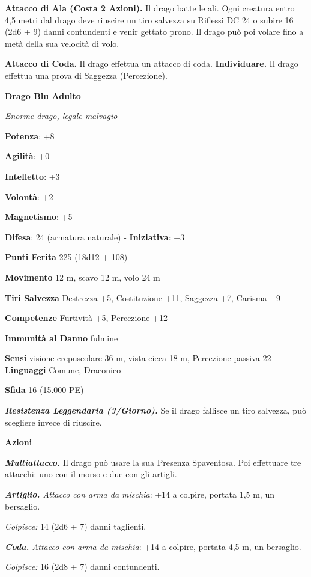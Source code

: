 \begin{multicols}{2}
\textbf{Attacco di Ala (Costa 2 Azioni).} Il drago batte le ali. Ogni
creatura entro 4,5 metri dal drago deve riuscire un tiro salvezza su Riflessi DC 24 o subire 16 (2d6 + 9) danni contundenti e venir gettato
prono. Il drago può poi volare fino a metà della sua velocità di volo.

\textbf{Attacco di Coda.} Il drago effettua un attacco di coda.
\textbf{Individuare.} Il drago effettua una prova di Saggezza
(Percezione).

\textbf{Drago Blu Adulto}

\emph{Enorme drago, legale malvagio}

\textbf{Potenza}: +8

\textbf{Agilità}: +0

\textbf{Intelletto}: +3

\textbf{Volontà}: +2

\textbf{Magnetismo}: +5

\textbf{Difesa}: 24 (armatura naturale) - \textbf{Iniziativa}: +3

\textbf{Punti Ferita} 225 (18d12 + 108)

\textbf{Movimento} 12 m, scavo 12 m, volo 24 m

\textbf{Tiri Salvezza} Destrezza +5, Costituzione +11, Saggezza +7,
Carisma +9

\textbf{Competenze} Furtività +5, Percezione +12

\textbf{Immunità al Danno} fulmine

\textbf{Sensi} visione crepuscolare 36 m, vista cieca 18 m, Percezione passiva
22 \textbf{Linguaggi} Comune, Draconico

\textbf{Sfida} 16 (15.000 PE)

\emph{\textbf{Resistenza Leggendaria (3/Giorno).}} Se il drago fallisce
un tiro salvezza, può scegliere invece di riuscire.

\textbf{Azioni}

\emph{\textbf{Multiattacco.}} Il drago può usare la sua Presenza
Spaventosa. Poi effettuare tre attacchi: uno con il morso e due con gli
artigli.

\emph{\textbf{Artiglio.} Attacco con arma da mischia}: +14 a colpire,
portata 1,5 m, un bersaglio.

\emph{Colpisce:} 14 (2d6 + 7) danni taglienti.

\emph{\textbf{Coda.} Attacco con arma da mischia}: +14 a colpire,
portata 4,5 m, un bersaglio.

\emph{Colpisce:} 16 (2d8 + 7) danni contundenti.


\end{multicols}
